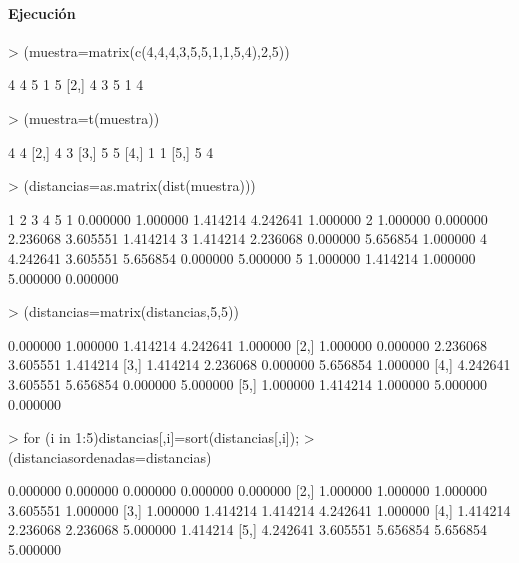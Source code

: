 \documentclass[a4paper, 12pt]{article}
\begin{document}
	\paragraph{Ejecución}
\begin{Schunk}
\begin{Sinput}
> (muestra=matrix(c(4,4,4,3,5,5,1,1,5,4),2,5))
\end{Sinput}
\begin{Soutput}
     [,1] [,2] [,3] [,4] [,5]
[1,]    4    4    5    1    5
[2,]    4    3    5    1    4
\end{Soutput}
\begin{Sinput}
> (muestra=t(muestra))
\end{Sinput}
\begin{Soutput}
     [,1] [,2]
[1,]    4    4
[2,]    4    3
[3,]    5    5
[4,]    1    1
[5,]    5    4
\end{Soutput}
\begin{Sinput}
> (distancias=as.matrix(dist(muestra)))
\end{Sinput}
\begin{Soutput}
         1        2        3        4        5
1 0.000000 1.000000 1.414214 4.242641 1.000000
2 1.000000 0.000000 2.236068 3.605551 1.414214
3 1.414214 2.236068 0.000000 5.656854 1.000000
4 4.242641 3.605551 5.656854 0.000000 5.000000
5 1.000000 1.414214 1.000000 5.000000 0.000000
\end{Soutput}
\begin{Sinput}
> (distancias=matrix(distancias,5,5))
\end{Sinput}
\begin{Soutput}
         [,1]     [,2]     [,3]     [,4]     [,5]
[1,] 0.000000 1.000000 1.414214 4.242641 1.000000
[2,] 1.000000 0.000000 2.236068 3.605551 1.414214
[3,] 1.414214 2.236068 0.000000 5.656854 1.000000
[4,] 4.242641 3.605551 5.656854 0.000000 5.000000
[5,] 1.000000 1.414214 1.000000 5.000000 0.000000
\end{Soutput}
\begin{Sinput}
> for (i in 1:5){distancias[,i]=sort(distancias[,i])};
>  (distanciasordenadas=distancias)
\end{Sinput}
\begin{Soutput}
         [,1]     [,2]     [,3]     [,4]     [,5]
[1,] 0.000000 0.000000 0.000000 0.000000 0.000000
[2,] 1.000000 1.000000 1.000000 3.605551 1.000000
[3,] 1.000000 1.414214 1.414214 4.242641 1.000000
[4,] 1.414214 2.236068 2.236068 5.000000 1.414214
[5,] 4.242641 3.605551 5.656854 5.656854 5.000000
\end{Soutput}

\end{Schunk}
\end{document}
